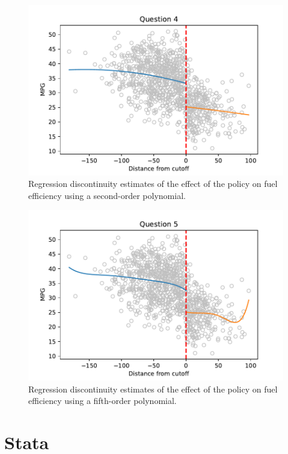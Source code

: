 \documentclass{article}
\begin{document}
\begin{figure}[ht]
\centering
\includegraphics{hw7q4.pdf}
\caption{Regression discontinuity estimates of the effect of the policy on fuel efficiency using a second-order polynomial.}
\label{fig:hw7q4}
\end{figure}

\begin{figure}[ht]
\centering
\includegraphics{hw7q5.pdf}
\caption{Regression discontinuity estimates of the effect of the policy on fuel efficiency using a fifth-order polynomial.}
\label{fig:hw7q5}
\end{figure}

\clearpage

\section{Stata}
\end{document}
